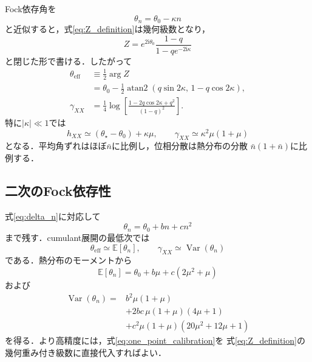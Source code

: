 \documentclass[dvipdfmx,a4paper,10pt]{jsarticle}
\newcommand{\ii}{\mathrm{i}}
\newcommand{\E}{\mathbb{E}}
\newcommand{\Var}{\operatorname{Var}}
\begin{document}
Fock依存角を
\begin{equation}
 \theta_n=\theta_0-\kappa n
\end{equation}
と近似すると，式\eqref{eq:Z_definition}は幾何級数となり，
\begin{equation}
 Z
 =e^{2\ii\theta_0}
 \frac{1-q}{1-qe^{-2\ii\kappa}}
 \label{eq:Z_linear}
\end{equation}
と閉じた形で書ける．したがって
\begin{align}
 \theta_{\mathrm{eff}}
 &\equiv\frac{1}{2}\arg Z\nonumber\\
 &=\theta_0-\frac{1}{2}
 \operatorname{atan2}
 \left(
 q\sin2\kappa,\,
 1-q\cos2\kappa
 \right),
 \label{eq:theta_eff_linear}\\
 \gamma_{XX}
 &=\frac{1}{4}\log
 \left[
 \frac{1-2q\cos2\kappa+q^2}{(1-q)^2}
 \right].
 \label{eq:gammaxx_linear}
\end{align}
特に$|\kappa|\ll1$では
\begin{equation}
 \boxed{
 h_{XX}
 \simeq
 (\theta_\star-\theta_0)+\kappa\mu,
 \qquad
 \gamma_{XX}
 \simeq
 \kappa^2\mu(1+\mu)
 }
 \label{eq:linear_small_kappa}
\end{equation}
となる．平均角ずれはほぼ$\bar n$に比例し，位相分散は熱分布の分散
$\bar n(1+\bar n)$に比例する．

\subsection{二次のFock依存性}

式\eqref{eq:delta_n}に対応して
\begin{equation}
 \theta_n=\theta_0+bn+cn^2
\end{equation}
まで残す．cumulant展開の最低次では
\begin{equation}
 \theta_{\mathrm{eff}}\simeq\E[\theta_n],
 \qquad
 \gamma_{XX}\simeq\Var(\theta_n)
 \label{eq:cumulant_leading}
\end{equation}
である．熱分布のモーメントから
\begin{equation}
 \E[\theta_n]
 =\theta_0+b\mu+c(2\mu^2+\mu)
 \label{eq:theta_mean_quadratic}
\end{equation}
および
\begin{align}
 \Var(\theta_n)
 ={}&
 b^2\mu(1+\mu)\nonumber\\
 &+2bc\,\mu(1+\mu)(4\mu+1)\nonumber\\
 &+c^2\mu(1+\mu)(20\mu^2+12\mu+1)
 \label{eq:theta_variance_quadratic}
\end{align}
を得る．より高精度には，式\eqref{eq:one_point_calibration}を
式\eqref{eq:Z_definition}の幾何重み付き級数に直接代入すればよい．
\end{document}
